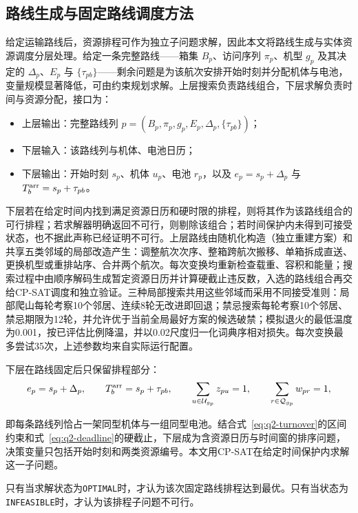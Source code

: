 \subsection{路线生成与固定路线调度方法}

给定运输路线后，资源排程可作为独立子问题求解，因此本文将路线生成与实体资源调度分层处理。给定一条完整路线——箱集 $B_p$、访问序列 $\pi_p$、机型 $g_p$ 及其决定的 $\Delta_p$、$E_p$ 与 $\{\tau_{pb}\}$——剩余问题是为该航次安排开始时刻并分配机体与电池，变量规模显著降低，可由约束规划求解。上层搜索负责路线组合，下层求解负责时间与资源分配，接口为：

\begin{itemize}
  \item 上层输出：完整路线列 $p=(B_p,\pi_p,g_p,E_p,\Delta_p,\{\tau_{pb}\})$；
  \item 下层输入：该路线列与机体、电池日历；
  \item 下层输出：开始时刻 $s_p$、机体 $u_p$、电池 $r_p$，以及 $e_p=s_p+\Delta_p$ 与 $T_b^{\rm arr}=s_p+\tau_{pb}$。
\end{itemize}

下层若在给定时间内找到满足资源日历和硬时限的排程，则将其作为该路线组合的可行排程；若求解器明确返回不可行，则剔除该组合；若时间保护内未得到可接受状态，也不据此声称已经证明不可行。上层路线由随机化构造（独立重建方案）和共享五类邻域的局部改造产生：调整航次次序、整箱跨航次搬移、单箱拆成直送、更换机型或重排站序、合并两个航次。每次变换均重新检查载重、容积和能量；搜索过程中由顺序解码生成暂定资源日历并计算硬截止违反数，入选的路线组合再交给CP-SAT调度和独立验证。三种局部搜索共用这些邻域而采用不同接受准则：局部爬山每轮考察10个邻居、连续8轮无改进即回退；禁忌搜索每轮考察10个邻居、禁忌期限为12轮，并允许优于当前全局最好方案的候选破禁；模拟退火的最低温度为0.001，按已评估比例降温，并以0.02尺度归一化词典序相对损失。每次变换最多尝试35次，上述参数均来自实际运行配置。

下层在路线固定后只保留排程部分：
\begin{equation}
e_p=s_p+\Delta_p,\qquad
T_b^{\rm arr}=s_p+\tau_{pb},\qquad
\sum_{u\in\mathcal{U}_{g_p}}z_{pu}=1,\qquad
\sum_{r\in\mathcal{Q}_{g_p}}w_{pr}=1,
\label{eq:q2-schedule}
\end{equation}

即每条路线列恰占一架同型机体与一组同型电池。结合式~\eqref{eq:q2-turnover}的区间约束和式~\eqref{eq:q2-deadline}的硬截止，下层成为含资源日历与时间窗的排序问题，决策变量只包括开始时刻和两类资源编号。本文用CP-SAT在给定时间保护内求解这一子问题。

只有当求解状态为\texttt{OPTIMAL}时，才认为该次固定路线排程达到最优。只有当状态为\texttt{INFEASIBLE}时，才认为该排程子问题不可行。

